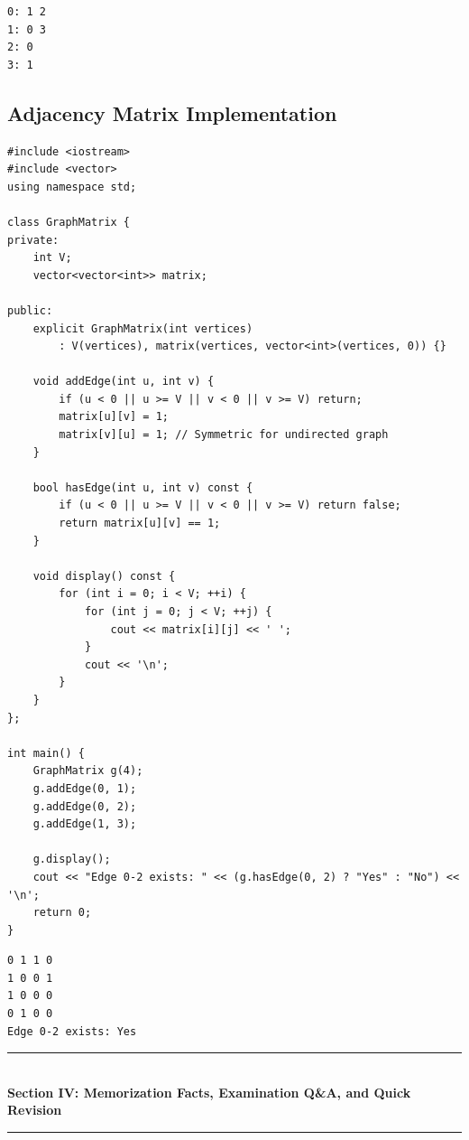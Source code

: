 \begin{lstlisting}[style=pseudocode, caption={Output of Adjacency List program.}]
0: 1 2 
1: 0 3 
2: 0 
3: 1 
\end{lstlisting}

\subsection{Adjacency Matrix Implementation}

\begin{lstlisting}[style=cppstyle, caption={C++ Graph implementation using Adjacency Matrix.}]
#include <iostream>
#include <vector>
using namespace std;

class GraphMatrix {
private:
    int V;
    vector<vector<int>> matrix;

public:
    explicit GraphMatrix(int vertices)
        : V(vertices), matrix(vertices, vector<int>(vertices, 0)) {}

    void addEdge(int u, int v) {
        if (u < 0 || u >= V || v < 0 || v >= V) return;
        matrix[u][v] = 1;
        matrix[v][u] = 1; // Symmetric for undirected graph
    }

    bool hasEdge(int u, int v) const {
        if (u < 0 || u >= V || v < 0 || v >= V) return false;
        return matrix[u][v] == 1;
    }

    void display() const {
        for (int i = 0; i < V; ++i) {
            for (int j = 0; j < V; ++j) {
                cout << matrix[i][j] << ' ';
            }
            cout << '\n';
        }
    }
};

int main() {
    GraphMatrix g(4);
    g.addEdge(0, 1);
    g.addEdge(0, 2);
    g.addEdge(1, 3);

    g.display();
    cout << "Edge 0-2 exists: " << (g.hasEdge(0, 2) ? "Yes" : "No") << '\n';
    return 0;
}
\end{lstlisting}

\begin{lstlisting}[style=pseudocode, caption={Output of Adjacency Matrix program.}]
0 1 1 0 
1 0 0 1 
1 0 0 0 
0 1 0 0 
Edge 0-2 exists: Yes
\end{lstlisting}

\newpage
\begin{center}
\vspace{0.5em}
{\color{primary}\rule{0.45\textwidth}{1.2pt}}\\[4pt]
{\Large\bfseries\color{primary} Section IV: Memorization Facts, Examination Q\&A, and Quick Revision}\\[2pt]
{\color{primary}\rule{0.45\textwidth}{1.2pt}}
\vspace{0.5em}
\end{center}

